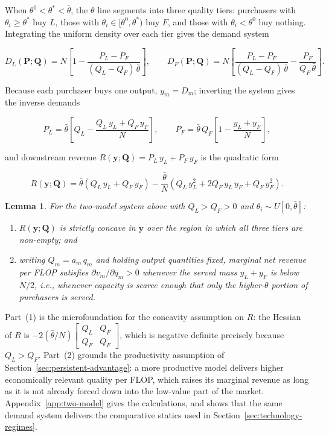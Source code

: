 \documentclass[11pt]{article}
\newtheorem{lemma}{Lemma}
\begin{document}
When $\theta^{0}<\theta^{*}<\bar\theta$, the $\theta$ line segments into three quality tiers: purchasers with $\theta_i\geq\theta^{*}$ buy $L$, those with $\theta_i\in[\theta^{0},\theta^{*})$ buy $F$, and those with $\theta_i<\theta^{0}$ buy nothing. Integrating the uniform density over each tier gives the demand system

\begin{equation}D_L(\mathbf P;\mathbf Q)=N\left[1-\frac{P_L-P_F}{(Q_L-Q_F)\,\bar\theta}\right],\qquad D_F(\mathbf P;\mathbf Q)=N\left[\frac{P_L-P_F}{(Q_L-Q_F)\,\bar\theta}-\frac{P_F}{Q_F\,\bar\theta}\right].\end{equation}

Because each purchaser buys one output, $y_m=D_m$; inverting the system gives the inverse demands

\begin{equation}P_L=\bar\theta\left[Q_L-\frac{Q_L\,y_L+Q_F\,y_F}{N}\right],\qquad P_F=\bar\theta\,Q_F\left[1-\frac{y_L+y_F}{N}\right],\end{equation}

and downstream revenue $R(\mathbf y;\mathbf Q)=P_L\,y_L+P_F\,y_F$ is the quadratic form

\begin{equation}R(\mathbf y;\mathbf Q)=\bar\theta\left(Q_L\,y_L+Q_F\,y_F\right)-\frac{\bar\theta}{N}\left(Q_L\,y_L^{2}+2Q_F\,y_L\,y_F+Q_F\,y_F^{2}\right).\end{equation}

\begin{lemma}\label{lem:two-model}
For the two-model system above with $Q_L>Q_F>0$ and $\theta_i\sim U[0,\bar\theta]$:
\begin{enumerate}
\item $R(\mathbf y;\mathbf Q)$ is strictly concave in $\mathbf y$ over the region in which all three tiers are non-empty; and
\item writing $Q_m=a_m\,q_m$ and holding output quantities fixed, marginal net revenue per FLOP satisfies $\partial v_m/\partial q_m>0$ whenever the served mass $y_L+y_F$ is below $N/2$, i.e., whenever capacity is scarce enough that only the higher-$\theta$ portion of purchasers is served.
\end{enumerate}
\end{lemma}

Part~(1) is the microfoundation for the concavity assumption on $R$: the Hessian of $R$ is $-2(\bar\theta/N)\left[\begin{smallmatrix}Q_L&Q_F\\ Q_F&Q_F\end{smallmatrix}\right]$, which is negative definite precisely because $Q_L>Q_F$. Part~(2) grounds the productivity assumption of Section~\ref{sec:persistent-advantage}: a more productive model delivers higher economically relevant quality per FLOP, which raises its marginal revenue as long as it is not already forced down into the low-value part of the market. Appendix~\ref{app:two-model} gives the calculations, and shows that the same demand system delivers the comparative statics used in Section~\ref{sec:technology-regimes}.
\end{document}
